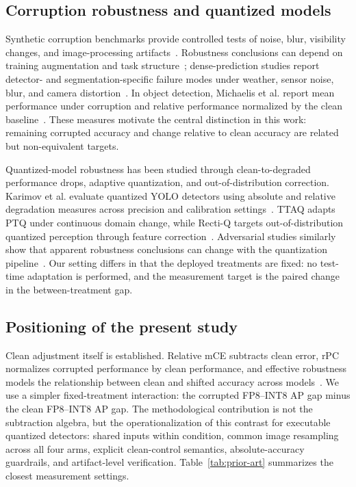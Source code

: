 \documentclass[a4paper,fleqn]{cas-dc}
\begin{document}
\subsection{Corruption robustness and quantized models}

Synthetic corruption benchmarks provide controlled tests of noise, blur, visibility changes, and image-processing artifacts~\citep{hendrycks2019corruptions}. Robustness conclusions can depend on training augmentation and task structure~\citep{mintun2021augmentations}; dense-prediction studies report detector- and segmentation-specific failure modes under weather, sensor noise, blur, and camera distortion~\citep{kamann2020segrobustness,michaelis2019detectorrobustness,liu2024realworldcorruptions}. In object detection, Michaelis et al. report mean performance under corruption and relative performance normalized by the clean baseline~\citep{michaelis2019detectorrobustness}. These measures motivate the central distinction in this work: remaining corrupted accuracy and change relative to clean accuracy are related but non-equivalent targets.

Quantized-model robustness has been studied through clean-to-degraded performance drops, adaptive quantization, and out-of-distribution correction. Karimov et al. evaluate quantized YOLO detectors using absolute and relative degradation measures across precision and calibration settings~\citep{karimov2025robustness}. TTAQ adapts PTQ under continuous domain change, while Recti-Q targets out-of-distribution quantized perception through feature correction~\citep{xiao2024ttaq,araghi2026rectiq}. Adversarial studies similarly show that apparent robustness conclusions can change with the quantization pipeline~\citep{li2024quantrobustness}. Our setting differs in that the deployed treatments are fixed: no test-time adaptation is performed, and the measurement target is the paired change in the between-treatment gap.

\subsection{Positioning of the present study}

Clean adjustment itself is established. Relative mCE subtracts clean error, rPC normalizes corrupted performance by clean performance, and effective robustness models the relationship between clean and shifted accuracy across models~\citep{hendrycks2019corruptions,michaelis2019detectorrobustness,taori2020measuring}. We use a simpler fixed-treatment interaction: the corrupted FP8--INT8 AP gap minus the clean FP8--INT8 AP gap. The methodological contribution is not the subtraction algebra, but the operationalization of this contrast for executable quantized detectors: shared inputs within condition, common image resampling across all four arms, explicit clean-control semantics, absolute-accuracy guardrails, and artifact-level verification. Table~\ref{tab:prior-art} summarizes the closest measurement settings.
\end{document}
